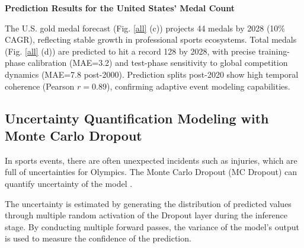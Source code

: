 \documentclass{mcmthesis}
\begin{document}
\textbf{Prediction Results for the United States’ Medal Count}

The U.S. gold medal forecast (Fig. \ref{all} (c)) projects 44 medals by 2028 (10\% CAGR), reflecting stable growth in professional sports ecosystems. Total medals (Fig. \ref{all} (d)) are predicted to hit a record 128 by 2028, with precise training-phase calibration (MAE=3.2) and test-phase sensitivity to global competition dynamics (MAE=7.8 post-2000). Prediction splits post-2020 show high temporal coherence (Pearson $r=0.89$), confirming adaptive event modeling capabilities.

\subsection{Uncertainty Quantification Modeling with Monte Carlo Dropout}

In sports events, there are often unexpected incidents such as injuries, which are full of uncertainties for Olympics. The Monte Carlo Dropout (MC Dropout) can quantify uncertainty of the model \cite{gal2016dropout}.

The uncertainty is estimated by generating the distribution of predicted values through multiple random activation of the Dropout layer during the inference stage. By conducting multiple forward passes, the variance of the model's output is used to measure the confidence of the prediction.
\end{document}
